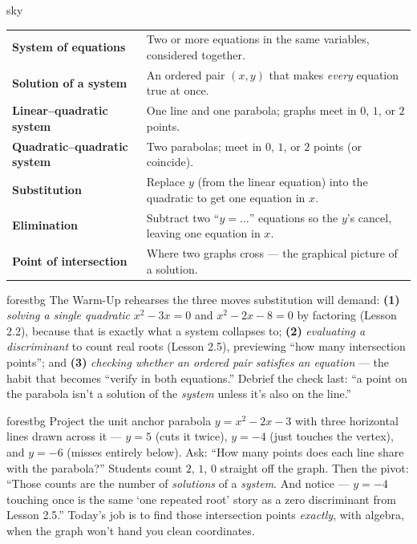 \documentclass[10pt]{article}
\begin{document}
\begin{skillbox}{sky}
\renewcommand{\arraystretch}{1.3}
\begin{tabularx}{\linewidth}{@{}l X@{}}
\textbf{System of equations} & Two or more equations in the same variables, considered together. \\
\textbf{Solution of a system} & An ordered pair $(x,y)$ that makes \emph{every} equation true at once. \\
\textbf{Linear--quadratic system} & One line and one parabola; graphs meet in $0$, $1$, or $2$ points. \\
\textbf{Quadratic--quadratic system} & Two parabolas; meet in $0$, $1$, or $2$ points (or coincide). \\
\textbf{Substitution} & Replace $y$ (from the linear equation) into the quadratic to get one equation in $x$. \\
\textbf{Elimination} & Subtract two ``$y=\dots$'' equations so the $y$'s cancel, leaving one equation in $x$. \\
\textbf{Point of intersection} & Where two graphs cross --- the graphical picture of a solution. \\
\end{tabularx}
\end{skillbox}

\begin{fixedskillbox}{forestbg}
    The Warm-Up rehearses the three moves substitution will demand: \textbf{(1)} \emph{solving a single quadratic}
    $x^2-3x=0$ and $x^2-2x-8=0$ by factoring (Lesson 2.2), because that is exactly what a system collapses to;
    \textbf{(2)} \emph{evaluating a discriminant} to count real roots (Lesson 2.5), previewing ``how many
    intersection points''; and \textbf{(3)} \emph{checking whether an ordered pair satisfies an equation}
    --- the habit that becomes ``verify in both equations.'' Debrief the check last: ``a point on the parabola
    isn't a solution of the \emph{system} unless it's also on the line.''
\end{fixedskillbox}

\begin{skillbox}[Hook]{forestbg}
    Project the unit anchor parabola $y=x^2-2x-3$ with three horizontal lines drawn across it --- $y=5$ (cuts it
    twice), $y=-4$ (just touches the vertex), and $y=-6$ (misses entirely below). Ask: ``How many points does
    each line share with the parabola?'' Students count $2$, $1$, $0$ straight off the graph. Then the pivot:
    ``Those counts are the number of \emph{solutions} of a \emph{system}. And notice --- $y=-4$ touching once is
    the same `one repeated root' story as a zero discriminant from Lesson 2.5.'' Today's job is to find those
    intersection points \emph{exactly}, with algebra, when the graph won't hand you clean coordinates.
\end{skillbox}
\end{document}
